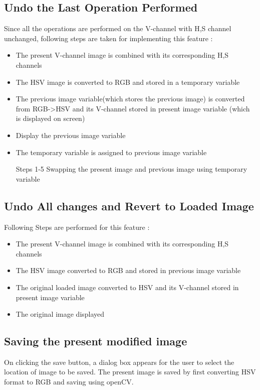 \documentclass[letterpaper, 10 pt, conference]{ieeeconf}  %
\begin{document}
\subsection{\textbf{Undo the Last Operation Performed}}
Since all the operations are performed on the V-channel with H,S channel unchanged, following steps are taken for implementing this feature :
\begin{itemize}
\item The present V-channel image is combined with its corresponding H,S channels
\item The HSV image is converted to RGB and stored in a temporary variable
\item The previous image variable(which stores the previous image) is converted from RGB->HSV and its V-channel stored in present image variable (which is displayed on screen)
\item Display the previous image variable
\item The temporary variable is assigned to previous image variable
\item [Steps 1-5] Swapping the present image and previous image using temporary variable
\end{itemize}

\subsection{\textbf{Undo All changes and Revert to Loaded Image}}
Following Steps are performed for this feature :
\begin{itemize}
\item The present V-channel image is combined with its corresponding H,S channels
\item The HSV image converted to RGB and stored in previous image variable
\item The original loaded image converted to HSV and its V-channel stored in present image variable
\item The original image displayed
\end{itemize}

\subsection{\textbf{Saving the present modified image}}
On clicking the save button, a dialog box appears for the user to select the location of image to be saved. The present image is saved by first converting HSV format to RGB and saving using openCV. 
\end{document}
